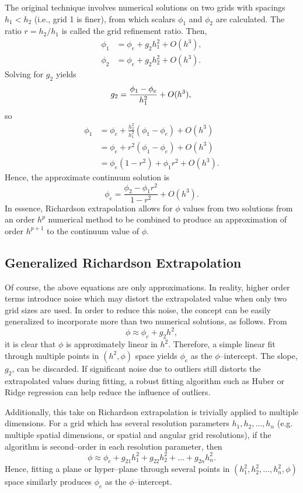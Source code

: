 The original technique involves numerical solutions on two grids with spacings $h_1 < h_2$ (i.e., grid 1 is finer), from which scalars $\phi_1$ and $\phi_2$ are calculated.
The ratio $r = h_2/h_1$ is called the grid refinement ratio.
Then,
\begin{align*}
  \phi_1 &= \phi_e + g_2 h_1^2 + O(h^3), \\
  \phi_2 &= \phi_e + g_2 h_2^2 + O(h^3).
\end{align*}
Solving for $g_2$ yields
\begin{equation*}
  g_2 = \frac{\phi_1 - \phi_e}{h_1^2} + O(h^3), \\
\end{equation*}
so
\begin{align*}
  \phi_1 &= \phi_e + \frac{h_2^2}{h_1^2}(\phi_1 - \phi_e) + O(h^3) \\
  &=  \phi_e + r^2(\phi_1 - \phi_e) + O(h^3) \\
  &= \phi_e(1-r^2) + \phi_1 r^2 + O(h^3).
\end{align*}
Hence, the approximate continuum solution is
\begin{equation*}
  \phi_e = \frac{\phi_2 - \phi_1 r^2}{1 - r^2} + O(h^3).
\end{equation*}
In essence, Richardson extrapolation allows for $\phi$ values from two solutions from an order $h^p$ numerical method to be combined to produce an approximation of order $h^{p+1}$ to the continuum value of $\phi$.

\subsection{Generalized Richardson Extrapolation}
\label{sec:generalized_re}
Of course, the above equations are only approximations.
In reality, higher order terms introduce noise which may distort the extrapolated value
when only two grid sizes are used.
In order to reduce this noise, the concept can be easily generalized to incorporate more than two numerical solutions, as follows.
From
\begin{equation*}
  \phi \approx \phi_e + g_2 h^2,
\end{equation*}
it is clear that $\phi$ is approximately linear in $h^2$.
Therefore, a simple linear fit through multiple points in $(h^2, \phi)$ space yields $\phi_e$ as the $\phi$--intercept.
The slope, $g_2$, can be discarded.
If significant noise due to outliers still distorts the extrapolated values during fitting, a robust fitting algorithm such as Huber \cite{yu_robust_2014} or Ridge \cite{hoerl_ridge_1970} regression can help reduce the influence of outliers.

Additionally, this take on Richardson extrapolation is trivially applied to multiple dimensions.
For a grid which has several resolution parameters $h_1, h_2, \ldots, h_n$ (e.g. multiple spatial dimensions, or spatial and angular grid resolutions), if the algorithm is second--order in each resolution parameter, then
\begin{equation*}
  \phi \approx \phi_e + g_{21} h_1^2 + g_{22} h_2^2 + \ldots + g_{2n} h_n^2.
\end{equation*}
Hence, fitting a plane or hyper--plane through several points in $(h_1^2, h_2^2, \ldots, h_n^2, \phi)$ space similarly produces $\phi_e$ as the $\phi$--intercept.
